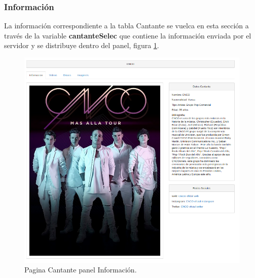 \subsubsection*{Información}
La información correspondiente a la tabla Cantante se vuelca en esta sección a través de la variable \textbf{cantanteSelec} que contiene la información enviada por el servidor y se distribuye dentro del panel, figura \ref{fig:Info_Cantante}.
\begin{figure}[!h]
\begin{center}
   \includegraphics[width=0.5\linewidth]{Figures/init_Cantante}
	\decoRule
	\caption[Cantante panel Información]{Pagina Cantante panel Información.}
\label{fig:Info_Cantante}
\end{center}
\end{figure}
